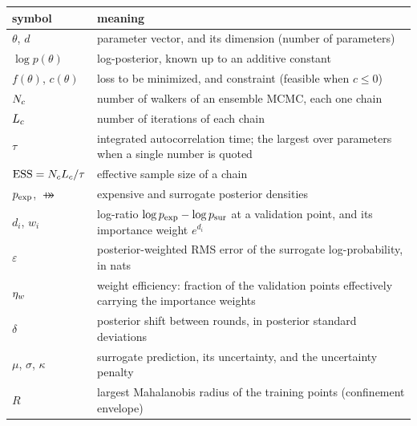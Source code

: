 \begin{center}
\small
\begin{tabularx}{\linewidth}{@{}l L@{}}
  \toprule
  \textbf{symbol} & \textbf{meaning} \\
  \midrule
  $\theta$, $d$                       & parameter vector, and its dimension (number of parameters) \\
  $\log p(\theta)$                    & log-posterior, known up to an additive constant \\
  $f(\theta)$, $c(\theta)$            & loss to be minimized, and constraint (feasible when $c \le 0$) \\
  $N_c$                               & number of walkers of an ensemble MCMC, each one chain \\
  $L_c$                               & number of iterations of each chain \\
  $\tau$                              & integrated autocorrelation time; the largest over parameters when a single number is quoted \\
  $\mathrm{ESS} = N_cL_c/\tau$                & effective sample size of a chain \\
  $p_{\mathrm{exp}}$, $\psur$                    & expensive and surrogate posterior densities \\
  $d_i$, $w_i$                        & log-ratio $\log p_{\mathrm{exp}} - \log p_{\mathrm{sur}}$ at a validation point, and its importance weight $e^{d_i}$ \\
  $\varepsilon$                       & posterior-weighted RMS error of the surrogate log-probability, in nats \\
  $\eta_w$                             & weight efficiency: fraction of the validation points effectively carrying the importance weights \\
  $\delta$                            & posterior shift between rounds, in posterior standard deviations \\
  $\mu$, $\sigma$, $\kappa$           & surrogate prediction, its uncertainty, and the uncertainty penalty \\
  $R$                                 & largest Mahalanobis radius of the training points (confinement envelope) \\
  \bottomrule
\end{tabularx}
\end{center}
